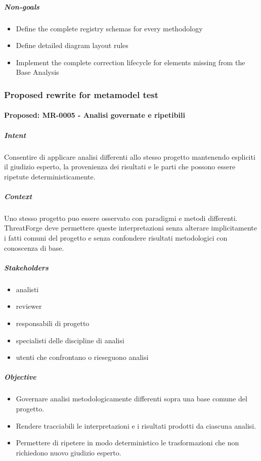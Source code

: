 \documentclass[
  10pt,
]{article}
\providecommand{\tightlist}{%
  \setlength{\itemsep}{0pt}\setlength{\parskip}{0pt}}
\begin{document}
\subparagraph{Non-goals}\label{non-goals-4}

\begin{itemize}
\tightlist
\item
  Define the complete registry schemas for every methodology
\item
  Define detailed diagram layout rules
\item
  Implement the complete correction lifecycle for elements missing from
  the Base Analysis
\end{itemize}

\subsubsection{Proposed rewrite for metamodel
test}\label{proposed-rewrite-for-metamodel-test-4}

\paragraph{Proposed: MR-0005 - Analisi governate e
ripetibili}\label{proposed-mr-0005---analisi-governate-e-ripetibili}

\subparagraph{Intent}\label{intent-10}

Consentire di applicare analisi differenti allo stesso progetto
mantenendo espliciti il giudizio esperto, la provenienza dei risultati e
le parti che possono essere ripetute deterministicamente.

\subparagraph{Context}\label{context-10}

Uno stesso progetto puo essere osservato con paradigmi e metodi
differenti. ThreatForge deve permettere queste interpretazioni senza
alterare implicitamente i fatti comuni del progetto e senza confondere
risultati metodologici con conoscenza di base.

\subparagraph{Stakeholders}\label{stakeholders-5}

\begin{itemize}
\tightlist
\item
  analisti
\item
  reviewer
\item
  responsabili di progetto
\item
  specialisti delle discipline di analisi
\item
  utenti che confrontano o rieseguono analisi
\end{itemize}

\subparagraph{Objective}\label{objective-5}

\begin{itemize}
\tightlist
\item
  Governare analisi metodologicamente differenti sopra una base comune
  del progetto.
\item
  Rendere tracciabili le interpretazioni e i risultati prodotti da
  ciascuna analisi.
\item
  Permettere di ripetere in modo deterministico le trasformazioni che
  non richiedono nuovo giudizio esperto.
\end{itemize}
\end{document}
